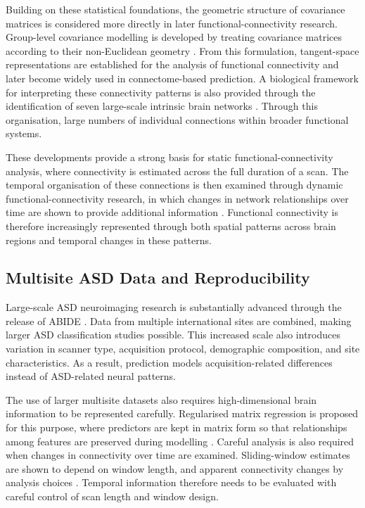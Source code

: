 Building on these statistical foundations, the geometric structure of covariance matrices is considered more directly in later functional-connectivity research. Group-level covariance modelling is developed by treating covariance matrices according to their non-Euclidean geometry \citep{Varoquauxetal2010}. From this formulation, tangent-space representations are established for the analysis of functional connectivity and later become widely used in connectome-based prediction. A biological framework for interpreting these connectivity patterns is also provided through the identification of seven large-scale intrinsic brain networks \citep{Yeoetal2011}. Through this organisation, large numbers of individual connections  within broader functional systems.

These developments provide a strong basis for static functional-connectivity analysis, where connectivity is estimated across the full duration of a scan. The temporal organisation of these connections is then examined through dynamic functional-connectivity research, in which changes in network relationships over time are shown to provide additional information \citep{Hutchisonetal2013}. Functional connectivity is therefore increasingly represented through both spatial patterns across brain regions and temporal changes in these patterns.


\subsection{Multisite ASD Data and Reproducibility}

Large-scale ASD neuroimaging research is substantially advanced through the release of ABIDE \citep{DiMartinoetal2014}. Data from multiple international sites are combined, making larger ASD classification studies possible. This increased scale also introduces variation in scanner type, acquisition protocol, demographic composition, and site characteristics. As a result, prediction models  acquisition-related differences instead of ASD-related neural patterns.

The use of larger multisite datasets also requires high-dimensional brain information to be represented carefully. Regularised matrix regression is proposed for this purpose, where predictors are kept in matrix form so that relationships among features are preserved during modelling \citep{ZhouLi2014}. Careful analysis is also required when changes in connectivity over time are examined. Sliding-window estimates are shown to depend on window length, and apparent connectivity changes  by analysis choices \citep{LeonardiVanDeVille2015}. Temporal information therefore needs to be evaluated with careful control of scan length and window design.

